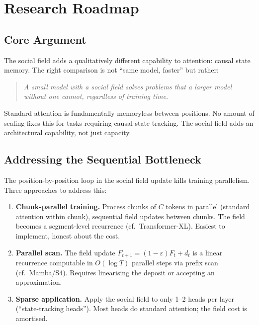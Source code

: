 \documentclass[11pt,a4paper]{article}
\begin{document}
\section{Research Roadmap}

\subsection{Core Argument}

The social field adds a qualitatively different capability to
attention: causal state memory.  The right comparison is not
``same model, faster'' but rather:
\begin{quote}
\emph{A small model with a social field solves problems that a
larger model without one cannot, regardless of training time.}
\end{quote}
Standard attention is fundamentally memoryless between positions.
No amount of scaling fixes this for tasks requiring causal state
tracking.  The social field adds an architectural capability, not
just capacity.

\subsection{Addressing the Sequential Bottleneck}

The position-by-position loop in the social field update kills
training parallelism.  Three approaches to address this:

\begin{enumerate}
    \item \textbf{Chunk-parallel training.}  Process chunks of
          $C$ tokens in parallel (standard attention within chunk),
          sequential field updates between chunks.  The field becomes
          a segment-level recurrence (cf.\ Transformer-XL).
          Easiest to implement, honest about the cost.

    \item \textbf{Parallel scan.}  The field update
          $F_{t+1} = (1-\varepsilon)F_t + d_t$ is a linear
          recurrence computable in $O(\log T)$ parallel steps via
          prefix scan (cf.\ Mamba/S4).  Requires linearising the
          deposit or accepting an approximation.

    \item \textbf{Sparse application.}  Apply the social field to
          only 1--2 heads per layer (``state-tracking heads'').
          Most heads do standard attention; the field cost is
          amortised.
\end{enumerate}
\end{document}
